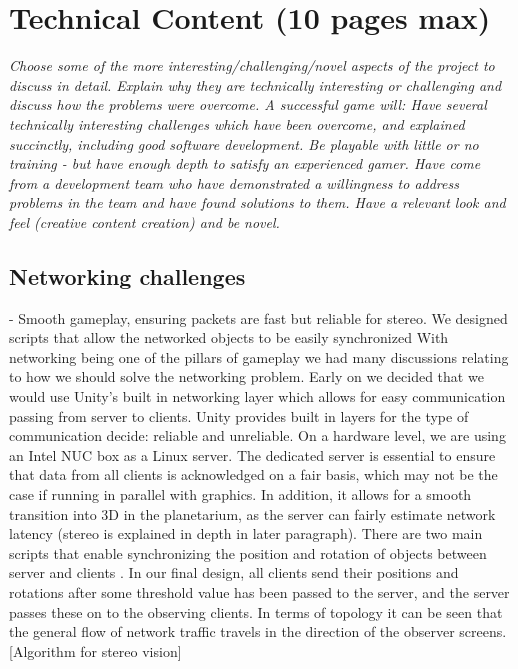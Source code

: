 \documentclass[11pt,a4paper]{article}
\begin{document}
\pagebreak


 \section{Technical Content (10 pages max)}

 \textit{Choose some of the more interesting/challenging/novel aspects of the project to discuss in detail. Explain why they are technically interesting or challenging and discuss how the problems were overcome. A successful game will:
 Have several technically interesting challenges which have been overcome, and explained succinctly, including good software development.
 Be playable with little or no training - but have enough depth to satisfy an experienced gamer.
 Have come from a development team who have demonstrated a willingness to address problems in the team and have found solutions to them.
 Have a relevant look and feel (creative content creation) and be novel.}
 
 \subsection{Networking challenges}
  - Smooth gameplay, ensuring packets are fast but reliable for stereo. We designed scripts that allow the networked objects to be easily synchronized
  With networking being one of the pillars of gameplay we had many discussions relating to how we should solve the networking problem. Early on we decided that we would use Unity’s built in networking layer which allows for easy communication passing from server to clients. Unity provides built in layers for the type of communication decide: reliable and unreliable.
  On a hardware level, we are using an Intel NUC box as a Linux server. The dedicated server is essential to ensure that data from all clients is acknowledged on a fair basis, which may not be the case if running in parallel with graphics. In addition, it allows for a smooth transition into 3D in the planetarium, as the server can fairly estimate network latency (stereo is explained in depth in later paragraph).
  There are two main scripts that enable synchronizing the position and rotation of objects between server and clients . In our final design, all clients send their positions and rotations after some threshold value has been passed to the server, and the server passes these on to the observing clients. In terms of topology it can be seen that the general flow of network traffic travels in the direction of the observer screens.
  [Algorithm for stereo vision]
\end{document}
